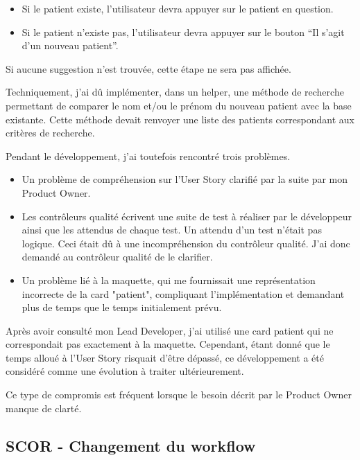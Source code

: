 \documentclass{article}
\begin{document}
\begin{itemize}
    \item Si le patient existe, l'utilisateur devra appuyer sur le patient en question.
    \item Si le patient n'existe pas, l'utilisateur devra appuyer sur le bouton “Il s'agit d'un nouveau patient”.
\end{itemize}

Si aucune suggestion n'est trouvée, cette étape ne sera pas affichée.


Techniquement, j'ai dû implémenter, dans un helper, une méthode de recherche permettant de comparer le nom et/ou le prénom du nouveau patient avec la base existante. Cette méthode devait renvoyer une liste des patients correspondant aux critères de recherche.

Pendant le développement, j'ai toutefois rencontré trois problèmes.

\begin{itemize}
    \item Un problème de compréhension sur l'User Story clarifié par la suite par mon Product Owner.
    \item Les contrôleurs qualité écrivent une suite de test à réaliser par le développeur ainsi que les attendus de chaque test. Un attendu d'un test n'était pas logique. Ceci était dû à une incompréhension du contrôleur qualité. J'ai donc demandé au contrôleur qualité de le clarifier.
    \item Un problème lié à la maquette, qui me fournissait une représentation incorrecte de la card "patient", compliquant l'implémentation et demandant plus de temps que le temps initialement prévu. 
\end{itemize}

Après avoir consulté mon Lead Developer, j'ai utilisé une card patient qui ne correspondait pas exactement à la maquette. Cependant, étant donné que le temps alloué à l'User Story risquait d'être dépassé, ce développement a été considéré comme une évolution à traiter ultérieurement.

Ce type de compromis est fréquent lorsque le besoin décrit par le Product Owner manque de clarté.

\subsection{SCOR - Changement du workflow}
\end{document}
